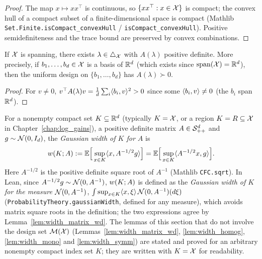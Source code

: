 \begin{proof}
\leanok
{}
The map $x \mapsto xx^\top$ is continuous, so $\{xx^\top : x\in\mathcal{X}\}$ is compact; the convex
hull of a compact subset of a finite-dimensional space is compact
(Mathlib \texttt{Set.Finite.isCompact\_convexHull} / \texttt{isCompact\_convexHull}).
Positive semidefiniteness and the trace bound are preserved by convex combinations.
\end{proof}

\begin{lemma}\label{lem:exists_posdef_design}
\leanok
{}
If $\mathcal{X}$ is spanning, there exists $\lambda \in \triangle_{\mathcal{X}}$ with $A(\lambda)$ positive
definite. More precisely, if $b_1, \dots, b_d \in \mathcal{X}$ is a basis of $\mathbb{R}^d$ (which exists since
$\operatorname{span}(\mathcal{X}) = \mathbb{R}^d$),
then the uniform design on $\{b_1,\dots,b_d\}$ has $A(\lambda) \succ 0$.
\end{lemma}

\begin{proof}
\leanok
{}
For $v \ne 0$, $v^\top A(\lambda) v = \frac1d \sum_i \langle b_i, v \rangle^2 > 0$ since some
$\langle b_i, v \rangle \neq 0$ (the $b_i$ span $\mathbb{R}^d$).
\end{proof}

\begin{definition}\label{def:width_matrix}
\leanok
{}
For a nonempty compact set $K \subseteq \mathbb{R}^d$ (typically $K = \mathcal{X}$, or a region $K = R \subseteq \mathcal{X}$
in Chapter~\ref{chap:log_gains}), a positive definite matrix $A \in \mathcal{S}_{++}^{d}$ and
$g \sim \mathcal{N}(0, I_d)$, the \emph{Gaussian width of $K$ for $A$} is
\[
  w(K;A) := \mathbb{E}\Big[ \sup_{x \in K} \langle x, A^{-1/2} g \rangle \Big]
  = \mathbb{E}\Big[ \sup_{x \in K} \langle A^{-1/2}x, g \rangle \Big].
\]
Here $A^{-1/2}$ is the positive definite square root of $A^{-1}$ (Mathlib \texttt{CFC.sqrt}).
In Lean, since $A^{-1/2}g \sim \mathcal{N}(0, A^{-1})$, $w(K;A)$ is defined as the
\emph{Gaussian width of $K$ for the measure $\mathcal{N}(0, A^{-1})$}, $\int \sup_{x \in K}\langle x, \xi \rangle\,\mathcal{N}(0,A^{-1})(d\xi)$
(\texttt{ProbabilityTheory.gaussianWidth}, defined for any measure), which avoids matrix square
roots in the definition; the two expressions agree by Lemma~\ref{lem:width_matrix_wd}.
The lemmas of this section that do not involve the design set $\mathcal{M}(\mathcal{X})$
(Lemmas~\ref{lem:width_matrix_wd}, \ref{lem:width_homog}, \ref{lem:width_mono} and
\ref{lem:width_symm}) are stated and proved for an arbitrary nonempty compact index set $K$;
they are written with $K = \mathcal{X}$ for readability.
\end{definition}


